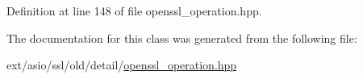 Definition at line 148 of file openssl\+\_\+operation.\+hpp.



The documentation for this class was generated from the following file\+:\begin{DoxyCompactItemize}
\item 
ext/asio/ssl/old/detail/\hyperlink{openssl__operation_8hpp}{openssl\+\_\+operation.\+hpp}\end{DoxyCompactItemize}
